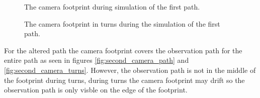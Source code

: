 \begin{figure}[]
    \centering
    \caption{The camera footprint during simulation of the first path.}
	\label{fig:first_camera_path}
\end{figure}

\begin{figure}[]
    \centering
    \caption{The camera footprint in turns during the simulation of the first path.}
	\label{fig:first_camera_turns}
\end{figure}

For the altered path the camera footprint covers the observation path for the entire path as seen in figures \ref{fig:second_camera_path} and \ref{fig:second_camera_turns}. However, the observation path is not in the middle of the footprint during turns, during turns the camera footprint may drift so the observation path is only visble on the edge of the footprint.

